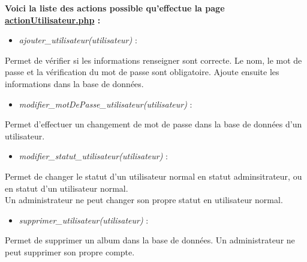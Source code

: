 			\begin{paragraphe}
                \textbf{Voici la liste des actions possible qu'effectue la page \underline{actionUtilisateur.php} :}
            
                \begin{itemize}
                    \item \emph{ajouter\_utilisateur(utilisateur)} :
                \end{itemize}
                \begin{paragraphe}
                    Permet de vérifier si les informations renseigner sont correcte. Le nom, le mot de passe et la vérification du mot de passe sont obligatoire. Ajoute ensuite les informations dans la base de données.
                \end{paragraphe}
                
                \begin{itemize}
                    \item \emph{modifier\_motDePasse\_utilisateur(utilisateur)} :
                \end{itemize}
                \begin{paragraphe}
                    Permet d'effectuer un changement de mot de passe dans la base de données d'un utilisateur.
                \end{paragraphe}
                
                \begin{itemize}
                    \item \emph{modifier\_statut\_utilisateur(utilisateur)} :
                \end{itemize}
                \begin{paragraphe}
                    Permet de changer le statut d'un utilisateur normal en statut adminsitrateur, ou en statut d'un utilisateur normal. \\
                    Un administrateur ne peut changer son propre statut en utilisateur normal.
                \end{paragraphe}
                
                \begin{itemize}
                    \item \emph{supprimer\_utilisateur(utilisateur)} :
                \end{itemize}
                \begin{paragraphe}
                    Permet de supprimer un album dans la base de données.
                    Un administrateur ne peut supprimer son propre compte.
                \end{paragraphe}
            \end{paragraphe}

